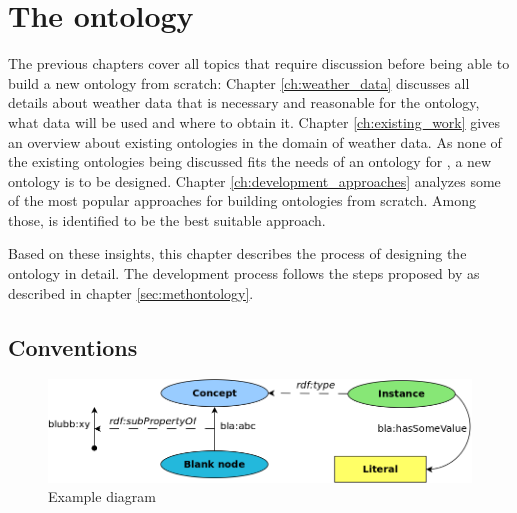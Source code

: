 \chapter{The \thinkhomeweather ontology}
\label{ch:thinkhomeweather_ontology}






The previous chapters cover all topics that require discussion before being able to build a new ontology from scratch: Chapter \ref{ch:weather_data} discusses all details about weather data that is necessary and reasonable for the \thinkhomeweather ontology, what data will be used and where to obtain it. Chapter \ref{ch:existing_work} gives an overview about existing ontologies in the domain of weather data. As none of the existing ontologies being discussed fits the needs of an ontology for \thinkhome, a new ontology is to be designed. Chapter \ref{ch:development_approaches} analyzes some of the most popular approaches for building ontologies from scratch. Among those, \methontology \cite{Methontology} is identified to be the best suitable approach.

Based on these insights, this chapter describes the process of designing the \thinkhomeweather ontology in detail. The development process follows the steps proposed by \methontology as described in chapter \ref{sec:methontology}.

\section{Conventions}
\label{sec:ontology_conventions}

\begin{figure}
  \includegraphics[width=\textwidth]{figures/diagrams/template.png}
  \caption{Example diagram}
  \label{fig:diagram_example}
\end{figure}

